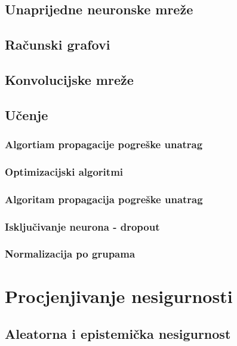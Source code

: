 \documentclass[utf8, diplomski, lmodern]{fer}
\begin{document}
\section{Unaprijedne neuronske mreže}


\section{Računski grafovi}


\section{Konvolucijske mreže}


\section{Učenje}

\subsection{Algortiam propagacije pogreške unatrag}

\subsection{Optimizacijski algoritmi} \label{subsec:dukn-u-optimizacijski-algoritmi}

\subsection{Algoritam propagacija pogreške unatrag}

\subsection{Isključivanje neurona - dropout}

\subsection{Normalizacija po grupama}



\chapter{Procjenjivanje nesigurnosti}


\section{Aleatorna i epistemička nesigurnost}
\end{document}

